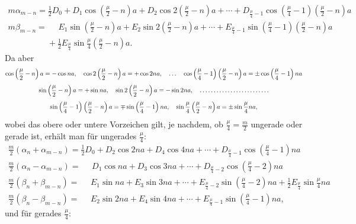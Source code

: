 \begin{landscape}
\[
\begin{array}{l}
m\alpha_{m-n} = \tfrac{1}{2}D_0 + D_1\cos\left(\frac{\mu}{2}-n\right)a + D_2\cos 2\left(\frac{\mu}{2}-n\right)a + \cdots + D_{\frac{\mu}{4}-1}\cos\left(\frac{\mu}{4}-1\right)\left(\frac{\mu}{2}-n\right)a \\[4pt]
m\beta_{m-n} = \phantom{{}={}} E_1\sin\left(\frac{\mu}{2}-n\right)a + E_2\sin 2\left(\frac{\mu}{2}-n\right)a + \cdots + E_{\frac{\mu}{4}-1}\sin\left(\frac{\mu}{4}-1\right)\left(\frac{\mu}{2}-n\right)a \\[4pt]
\phantom{m\beta_{m-n} = {}} + \tfrac{1}{2}E_{\frac{\mu}{4}}\sin\frac{\mu}{4}\left(\frac{\mu}{2}-n\right)a.
\end{array}
\]
Da aber
\[
\begin{gathered}
\cos\left(\frac{\mu}{2}-n\right)a = -\cos na, \quad \cos 2\left(\frac{\mu}{2}-n\right)a = +\cos 2na, \quad \ldots \quad \cos\left(\frac{\mu}{4}-1\right)\left(\frac{\mu}{2}-n\right)a = \pm\cos\left(\frac{\mu}{4}-1\right)na\\[4pt]
\sin\left(\frac{\mu}{2}-n\right)a = +\sin na, \quad \sin 2\left(\frac{\mu}{2}-n\right)a = -\sin 2na, \quad \mathord{.}\,\mathord{.}\,\mathord{.}\,\mathord{.}\,\mathord{.}\,\mathord{.}\,\mathord{.}\,\mathord{.}\,\mathord{.}\,\mathord{.}\,\mathord{.}\,\mathord{.}\,\mathord{.}\,\mathord{.}\,\mathord{.}\,\mathord{.}\,\mathord{.}\,\mathord{.}\,\mathord{.}\,\mathord{.}\,\mathord{.}\,\mathord{.}\,\mathord{.}\,\mathord{.}\,\mathord{.}\\[4pt]
\sin\left(\frac{\mu}{4}-1\right)\left(\frac{\mu}{2}-n\right)a = \mp\sin\left(\frac{\mu}{4}-1\right)na, \quad \sin\frac{\mu}{4}\left(\frac{\mu}{2}-n\right)a = \pm\sin\frac{\mu}{4}na,
\end{gathered}
\]
wobei das obere oder untere Vorzeichen gilt, je nachdem, ob \(\frac{\mu}{4}=\frac{m}{2}\) ungerade oder gerade ist, erhält man für ungerades \(\frac{\mu}{4}\):
\[
\tag*{5)}
\begin{array}{l}
\frac{m}{2}(\alpha_n+\alpha_{m-n}) = \tfrac{1}{2}D_0 + D_2\cos 2na + D_4\cos 4na + \cdots + D_{\frac{\mu}{4}-1}\cos\left(\frac{\mu}{4}-1\right)na \\[4pt]
\frac{m}{2}(\alpha_n-\alpha_{m-n}) = \phantom{{}={}} D_1\cos na + D_3\cos 3na + \cdots + D_{\frac{\mu}{4}-2}\cos\left(\frac{\mu}{4}-2\right)na \\[4pt]
\frac{m}{2}(\beta_n+\beta_{m-n}) = \phantom{{}={}} E_1\sin na + E_3\sin 3na + \cdots + E_{\frac{\mu}{4}-2}\sin\left(\frac{\mu}{4}-2\right)na + \tfrac{1}{2}E_{\frac{\mu}{4}}\sin\frac{\mu}{4}na \\[4pt]
\frac{m}{2}(\beta_n-\beta_{m-n}) = \phantom{{}={}} E_2\sin 2na + E_4\sin 4na + \cdots + E_{\frac{\mu}{4}-1}\sin\left(\frac{\mu}{4}-1\right)na,
\end{array}
\]
und für gerades \(\frac{\mu}{4}\):
\[
\tag*{6)}
\begin{array}{l}

\end{array}\]
\end{landscape}
